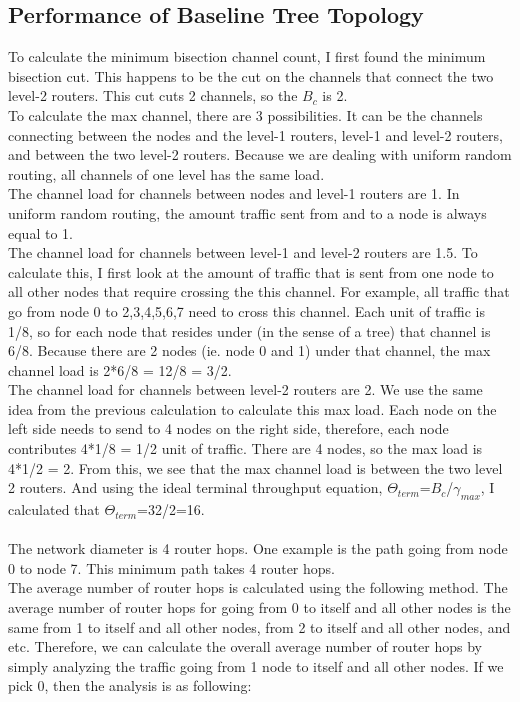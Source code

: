 \documentclass[10pt]{article}
\begin{document}
\subsection{Performance of Baseline Tree Topology}
To calculate the minimum bisection channel count, I first found the minimum bisection cut. This happens to be the cut on the channels that connect the two level-2 routers. This cut cuts 2 channels, so the $B_c$ is 2. \\
To calculate the max channel, there are 3 possibilities. It can be the channels connecting between the nodes and the level-1 routers, level-1 and level-2 routers, and between the two level-2 routers. Because we are dealing with uniform random routing, all channels of one level has the same load.\\
The channel load for channels between nodes and level-1 routers are 1. In uniform random routing, the amount traffic sent from and to a node is always equal to 1. \\
The channel load for channels between level-1 and level-2 routers are 1.5. To calculate this, I first look at the amount of traffic that is sent from one node to all other nodes that require crossing the this channel. For example, all traffic that go from node 0 to 2,3,4,5,6,7 need to cross this channel. Each unit of traffic is 1/8, so for each node that resides under (in the sense of a tree) that channel is 6/8. Because there are 2 nodes (ie. node 0 and 1) under that channel, the max channel load is 2*6/8 = 12/8 = 3/2.\\
The channel load for channels between level-2 routers are 2. We use the same idea from the previous calculation to calculate this max load. Each node on the left side needs to send to 4 nodes on the right side, therefore, each node contributes 4*1/8 = 1/2 unit of traffic. There are 4 nodes, so the max load is 4*1/2 = 2.
From this, we see that the max channel load is between the two level 2 routers. And using the ideal terminal throughput equation, $\Theta_{term}$=$B_c$/$\gamma_{max}$, I calculated that $\Theta_{term}$=32/2=16.\\
\\
The network diameter is 4 router hops. One example is the path going from node 0 to node 7. This minimum path takes 4 router hops.\\
The average number of router hops is calculated using the following method. The average number of router hops for going from 0 to itself and all other nodes is the same from 1 to itself and all other nodes, from 2 to itself and all other nodes, and etc. Therefore, we can calculate the overall average number of router hops by simply analyzing the traffic going from 1 node to itself and all other nodes. If we pick 0, then the analysis is as following:\\
\end{document}
